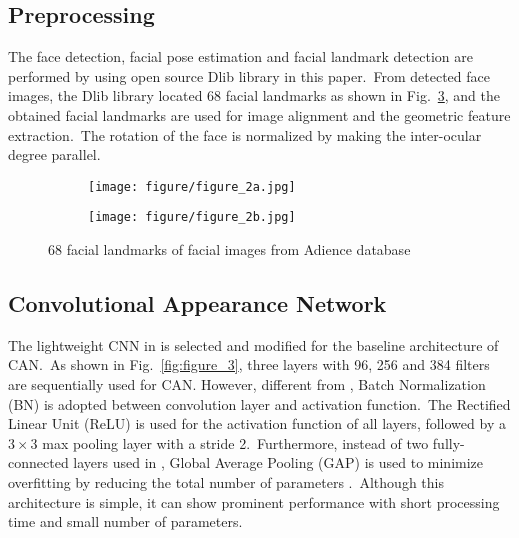 \documentclass[10pt,twocolumn,letterpaper]{article}
\begin{document}
\subsection{Preprocessing}
The face detection, facial pose estimation and facial landmark detection are performed by using open source Dlib library \cite{dlib09} in this paper.~From detected face images, the Dlib library located 68 facial landmarks as shown in Fig.~\ref{fig:figure_2}, and the obtained facial landmarks are used for image alignment and the geometric feature extraction.~The rotation of the face is normalized by making the inter-ocular degree parallel.
\begin{figure}[!h]
\centering
\begin{subfigure}[t]{0.4\linewidth}
    \centering
    \texttt{[image: figure/figure\_2a.jpg]}
    \caption{}
    \label{fig:figure_2a}
\end{subfigure}
\quad
\begin{subfigure}[t]{0.4\linewidth}
    \centering
    \texttt{[image: figure/figure\_2b.jpg]}
    \caption{}
    \label{fig:figure_2b}
\end{subfigure}
\caption{68 facial landmarks of facial images from Adience database \cite{Eidinger2014}}
\label{fig:figure_2}
\end{figure}

\subsection{Convolutional Appearance Network}
The lightweight CNN in \cite{Xing2017} is selected and modified for the baseline architecture of CAN.~As shown in Fig.~\ref{fig:figure_3}, three layers with 96, 256 and 384 filters are sequentially used for CAN. However, different from \cite{Xing2017}, Batch Normalization (BN) \cite{Ioffe2015} is adopted between convolution layer and activation function.~The Rectified Linear Unit (ReLU) \cite{Nair2010} is used for the activation function of all layers, followed by a $3\times3$ max pooling layer with a stride 2.~Furthermore, instead of two fully-connected layers used in \cite{Xing2017}, Global Average Pooling (GAP) is used to minimize overfitting by reducing the total number of parameters \cite{DBLP:journals/corr/LinCY13}.~Although this architecture is simple, it can show prominent performance with short processing time and small number of parameters.
\end{document}
